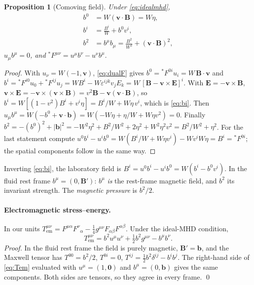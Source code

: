 \documentclass[11pt,a4paper,oneside,openany]{book}
\theoremstyle{definition}
\theoremstyle{plain}
\newtheorem{proposition}{Proposition}[chapter]
\theoremstyle{remark}
\newcommand{\vv}{\bm{v}}
\newcommand{\BB}{\bm{B}}
\newcommand{\EE}{\bm{E}}
\newcommand{\vB}{\eta}
\begin{document}
\begin{proposition}[Comoving field]\label{prop:bmu}
Under \eqref{eq:idealmhd},
\begin{align}
b^0&=W(\vv\cdot\BB)=W\vB, \label{eq:b0}\\
b^i&=\frac{B^i}{W}+b^0v^i, \label{eq:bi}\\
b^2&=b^\mu b_\mu=\frac{B^2}{W^2}+(\vv\cdot\BB)^2, \label{eq:b2}
\end{align}
$u_\mu b^\mu=0$, and ${}^\ast\!F^{\mu\nu}=u^\mu b^\nu-u^\nu b^\mu$.
\end{proposition}

\begin{proof}
With $u_\nu=W(-1,\vv)$, \eqref{eq:dualF} gives
$b^0={}^\ast\!F^{0i}u_i=W\,\BB\cdot\vv$ and
$b^i={}^\ast\!F^{i0}u_0+{}^\ast\!F^{ij}u_j=WB^i-W\varepsilon^{ijk}v_jE_k
=W\,[\BB-\vv\times\EE]^i$.
With $\EE=-\vv\times\BB$,
$\vv\times\EE=-\vv\times(\vv\times\BB)=v^2\BB-\vv(\vv\cdot\BB)$, so
$b^i=W[(1-v^2)B^i+v^i\vB]=B^i/W+W\vB\,v^i$, which is \eqref{eq:bi}. Then
$u_\mu b^\mu=W(-b^0+\vv\cdot\bm{b})=W(-W\vB+\vB/W+W\vB v^2)=0$. Finally
$b^2=-(b^0)^2+|\bm b|^2=-W^2\vB^2+B^2/W^2+2\vB^2+W^2\vB^2v^2=B^2/W^2+\vB^2$. For the
last statement compute $u^0b^i-u^ib^0=W(B^i/W+W\vB v^i)-Wv^iW\vB=B^i={}^\ast\!F^{0i}$;
the spatial components follow in the same way.
\end{proof}

Inverting \eqref{eq:bi}, the laboratory field is $B^i=u^0b^i-u^ib^0=W(b^i-b^0v^i)$.
In the fluid rest frame $b^\mu=(0,\BB')$: $b^\mu$ \emph{is} the rest-frame magnetic
field, and $b^2$ its invariant strength. The \emph{magnetic pressure} is $b^2/2$.

\paragraph{Electromagnetic stress--energy.} In our units
$T^{\mu\nu}_{\mathrm{em}}=F^{\mu\alpha}F^{\nu}{}_{\alpha}-\frac14g^{\mu\nu}F_{\alpha\beta}F^{\alpha\beta}$.
Under the ideal-MHD condition,
\begin{equation}\label{eq:Tem}
T^{\mu\nu}_{\mathrm{em}}=b^2u^\mu u^\nu+\tfrac12b^2g^{\mu\nu}-b^\mu b^\nu .
\end{equation}
\emph{Proof.} In the fluid rest frame the field is purely magnetic, $\BB'=\bm b$, and the
Maxwell tensor has $T^{00}=b^2/2$, $T^{0i}=0$, $T^{ij}=\frac12b^2\delta^{ij}-b^ib^j$.
The right-hand side of \eqref{eq:Tem} evaluated with $u^\mu=(1,\bm 0)$ and
$b^\mu=(0,\bm b)$ gives the same components. Both sides are tensors, so they agree in
every frame. \qed
\end{document}
